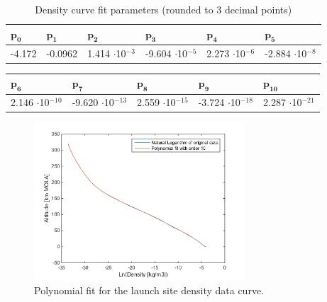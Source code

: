 \begin{table}[H]
\begin{center}
\caption{Density curve fit parameters (rounded to 3 decimal points)}
\label{tab:fitParametersDen}
{\renewcommand{\arraystretch}{1.2} %
\begin{tabular}{|l|l|l|l|l|l|}
\hline 
 $\mathbf{p_{0}}$ & $\mathbf{p_{1}}$ & $\mathbf{p_{2}}$ & $\mathbf{p_{3}}$ & $\mathbf{p_{4}}$ & $\mathbf{p_{5}}$  \\ \hline
 -4.172 & -0.0962 & 1.414 $\cdot$10$^{-3}$ & -9.604 $\cdot$10$^{-5}$ & 2.273 $\cdot$10$^{-6}$ & -2.884 $\cdot$10$^{-8}$  \\ \hline 
\end{tabular}
}
\end{center}
\end{table} 
 
 
 \begin{table}[H]
\begin{center}
{\renewcommand{\arraystretch}{1.2} %
\begin{tabular}{|l|l|l|l|l|}
 \hline
  $\mathbf{p_{6}}$ & $\mathbf{p_{7}}$ & $\mathbf{p_{8}}$ & $\mathbf{p_{9}}$ & $\mathbf{p_{10}}$  \\ \hline 
2.146 $\cdot$10$^{-10}$ & -9.620 $\cdot$10$^{-13}$ & 2.559 $\cdot$10$^{-15}$  & -3.724 $\cdot$10$^{-18}$ & 2.287 $\cdot$10$^{-21}$  \\ \hline 
\end{tabular}
}
\end{center}
\end{table}



\begin{figure}[H]
\centering
\includegraphics[width=0.7\textwidth]{figures/software/completeExpPolyFitDen.png}
\caption{Polynomial fit for the launch site density data curve.}
\label{fig:completeExpPolyFitDen}
\end{figure}

